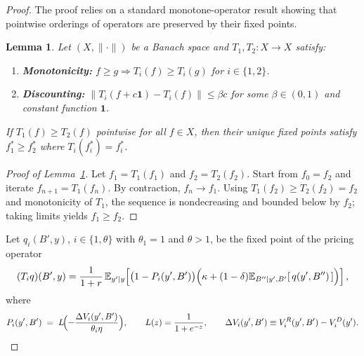 \documentclass[12pt]{article}
\theoremstyle{plain}
\newtheorem{lemma}{Lemma}
\newcommand{\E}{\mathbb{E}}
\begin{document}
\begin{proof}
	The proof relies on a standard monotone-operator result showing that pointwise orderings of operators are preserved by their fixed points.

	\begin{lemma}\label{lem:operator_dominance}
		Let $(X,\|\cdot\|)$ be a Banach space and $T_1,T_2:X\to X$ satisfy:
		\begin{enumerate}
			\item \textbf{Monotonicity:} $f\ge g \Rightarrow T_i(f)\ge T_i(g)$ for $i\in\{1,2\}$.
			\item \textbf{Discounting:} $\|T_i(f+c\mathbf{1})-T_i(f)\|\le \beta c$ for some $\beta\in(0,1)$ and constant function $\mathbf{1}$.
		\end{enumerate}
		If $T_1(f)\ge T_2(f)$ pointwise for all $f\in X$, then their unique fixed points satisfy $f_1^*\ge f_2^*$ where $T_i(f_i^*)=f_i^*$.
	\end{lemma}

	\begin{proof}[Proof of Lemma~\ref{lem:operator_dominance}]
		Let $f_1=T_1(f_1)$ and $f_2=T_2(f_2)$. Start from $f_0=f_2$ and iterate $f_{n+1}=T_1(f_n)$. By contraction, $f_n\to f_1$. Using $T_1(f_2)\ge T_2(f_2)=f_2$ and monotonicity of $T_1$, the sequence is nondecreasing and bounded below by $f_2$; taking limits yields $f_1\ge f_2$.
	\end{proof}

	Let $q_i(B',y)$, $i\in\{1,\theta\}$ with $\theta_1=1$ and $\theta>1$, be the
	fixed point of the pricing operator
	\begin{equation}
		(T_i q)(B',y)=\frac{1}{1+r}\,\E_{y'|y}\!\left[\bigl(1-P_i(y',B')\bigr)\Bigl(\kappa+(1-\delta)\E_{B''|y',B'}[\,q(y',B'')\,]\Bigr)\right],
		\label{eq:pricing_operator}
	\end{equation}
	where
	\begin{equation}
		P_i(y',B') \;=\; L\!\Bigl(-\frac{\Delta V_i(y',B')}{\theta_i\eta}\Bigr),\qquad
		L(z)=\frac{1}{1+e^{-z}},\qquad
		\Delta V_i(y',B')\equiv V_i^R(y',B')-V_i^D(y').
		\label{eq:net_value_definition}
	\end{equation}


\end{proof}
\end{document}
